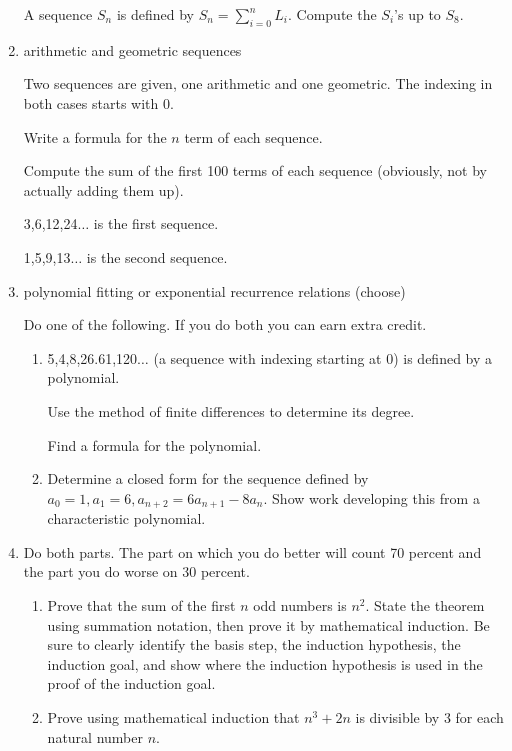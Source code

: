 \documentclass[12pt]{article}
\begin{document}
\begin{enumerate}
A sequence $S_n$ is defined by $S_n = \sum_{i=0}^n L_i$.  Compute the $S_i$'s up to $S_8$.

\newpage

\item  arithmetic and geometric sequences

Two sequences are given, one arithmetic and one geometric.  The indexing in both cases starts with 0.

Write a formula for the $n$ term of each sequence.

Compute the sum of the first 100 terms of each sequence (obviously, not by actually adding them up).

3,6,12,24$\ldots$ is the first sequence.

1,5,9,13$\ldots$ is the second sequence.

\newpage

\item  polynomial fitting or exponential recurrence relations (choose)

Do one of the following.  If you do both you can earn extra credit.

\begin{enumerate}

\item 5,4,8,26.61,120$\ldots$ (a sequence with indexing starting at 0) is defined by a polynomial.  

Use the method of finite differences to determine its degree.

Find a formula for the polynomial.

\item  Determine a closed form for the sequence defined by $a_0 =1, a_1=6, a_{n+2}=6a_{n+1}-8a_n$.  Show work developing this from a characteristic polynomial.

\end{enumerate}

\newpage

\item   Do both parts.  The part on which you do better will count 70 percent and the part you do worse on 30 percent.

\begin{enumerate}

\item  Prove that the sum of the first $n$ odd numbers is $n^2$.  State the theorem using summation notation, then prove it by mathematical induction.
Be sure to clearly identify the basis step, the induction hypothesis, the induction goal, and show where the induction hypothesis is used in the proof of the induction goal.


\item  Prove using mathematical induction that $n^3 + 2n$ is divisible by 3 for each natural number $n$.

\end{enumerate}

\newpage



\end{enumerate}
\end{document}
